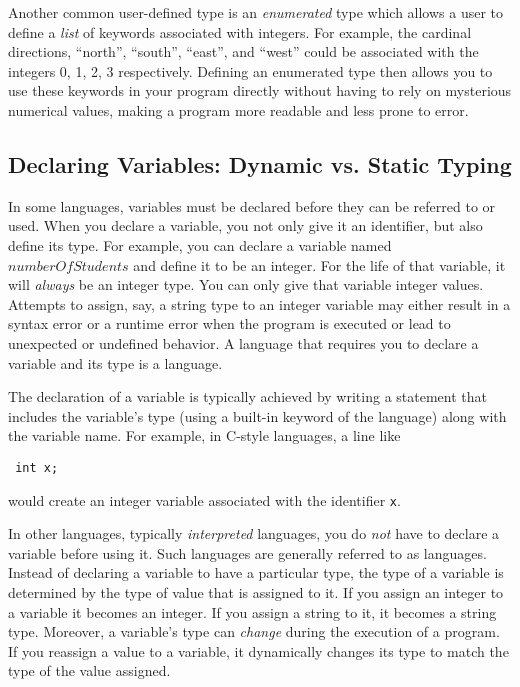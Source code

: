 Another common user-defined type is an \emph{enumerated} type which allows
a user to define a \emph{list} of keywords associated with integers.  For example,
the cardinal directions, ``north'', ``south'', ``east'', and ``west'' could be associated
with the integers 0, 1, 2, 3 respectively.   Defining an enumerated type then allows
you to use these keywords in your program directly without having to rely on
mysterious numerical values, making a program more readable and less prone to
error.

\subsection{Declaring Variables: Dynamic vs. Static Typing}

In some languages, variables must be declared before they can be referred to
or used.  When you declare a variable, you not only give it an identifier, but also
define its type.  For example, you can declare a variable named $numberOfStudents$
and define it to be an integer.  For the life of that variable, it will \emph{always}
be an integer type.  You can only give that variable integer values.  Attempts to
assign, say, a string type to an integer variable may either result in a syntax error
or a runtime error when the program is executed or lead to unexpected or 
undefined behavior.  A language that requires you to declare a variable and its
type is a  language.  

The declaration of a variable is typically achieved by writing a statement that
includes the variable's type (using a built-in keyword of the language) along with the
variable name.  For example, in C-style languages, a line like

\texttt{  int x;} 

would create an integer variable associated with the identifier \texttt{x}. 

In other languages, typically \emph{interpreted} languages, you do \emph{not}
have to declare a variable before using it.  Such languages are generally
referred to as  languages.  Instead
of declaring a variable to have a particular type, the type of a variable is 
determined by the type of value that is assigned to it.  If you assign an
integer to a variable it becomes an integer.  If you assign a string to it, 
it becomes a string type.  Moreover, a variable's type can \emph{change}
during the execution of a program.  If you reassign a value to a variable, it
dynamically changes its type to match the type of the value assigned.


